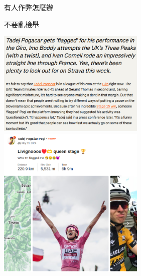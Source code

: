 \begin{frame}{有人作弊怎麼辦}
\begin{itemize}
\begin{multicols}{2}
{}
\end{multicols}
\end{itemize}
\end{frame}

\begin{frame}{不要亂檢舉}
\begin{multicols}{2}
\includegraphics[width=7cm]{flag5.png}
\newpage
\includegraphics[width=7cm]{flag4.png}
\end{multicols}
\end{frame}
